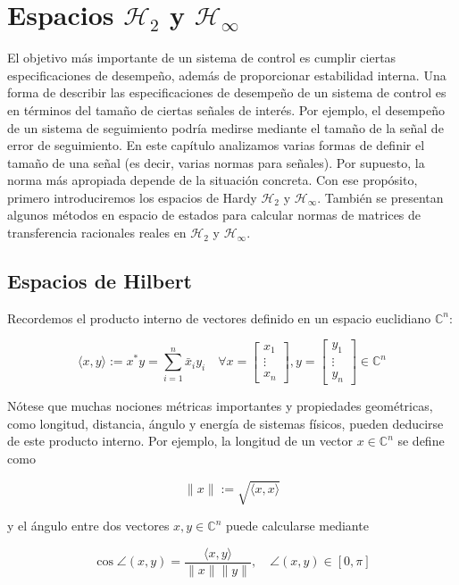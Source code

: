 \chapter{Espacios $\mathcal{H}_{2}$ y $\mathcal{H}_{\infty}$}
El objetivo más importante de un sistema de control es cumplir ciertas especificaciones de desempeño, además de proporcionar estabilidad interna. Una forma de describir las especificaciones de desempeño de un sistema de control es en términos del tamaño de ciertas señales de interés. Por ejemplo, el desempeño de un sistema de seguimiento podría medirse mediante el tamaño de la señal de error de seguimiento. En este capítulo analizamos varias formas de definir el tamaño de una señal (es decir, varias normas para señales). Por supuesto, la norma más apropiada depende de la situación concreta. Con ese propósito, primero introduciremos los espacios de Hardy $\mathcal{H}_{2}$ y $\mathcal{H}_{\infty}$. También se presentan algunos métodos en espacio de estados para calcular normas de matrices de transferencia racionales reales en $\mathcal{H}_{2}$ y $\mathcal{H}_{\infty}$.

\section{Espacios de Hilbert}
Recordemos el producto interno de vectores definido en un espacio euclidiano $\mathbb{C}^{n}$:

$$
\langle x, y\rangle:=x^{*} y=\sum_{i=1}^{n} \bar{x}_{i} y_{i} \quad \forall x=\left[\begin{array}{c}
x_{1} \\
\vdots \\
x_{n}
\end{array}\right], y=\left[\begin{array}{c}
y_{1} \\
\vdots \\
y_{n}
\end{array}\right] \in \mathbb{C}^{n}
$$

Nótese que muchas nociones métricas importantes y propiedades geométricas, como longitud, distancia, ángulo y energía de sistemas físicos, pueden deducirse de este producto interno. Por ejemplo, la longitud de un vector $x \in \mathbb{C}^{n}$ se define como

$$
\|x\|:=\sqrt{\langle x, x\rangle}
$$

y el ángulo entre dos vectores $x, y \in \mathbb{C}^{n}$ puede calcularse mediante

$$
\cos \angle(x, y)=\frac{\langle x, y\rangle}{\|x\|\|y\|}, \quad \angle(x, y) \in[0, \pi]
$$

